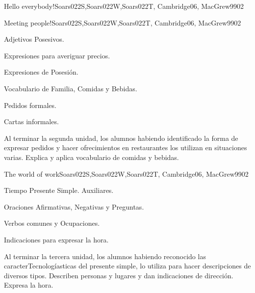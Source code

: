 \begin{syllabus}
\begin{unit}{Hello everybody!}{Soars022S,Soars022W,Soars022T, Cambridge06, MacGrew99}{0}{2}
\end{unit}

\begin{unit}{Meeting people!}{Soars022S,Soars022W,Soars022T, Cambridge06, MacGrew99}{0}{2}
   \begin{topics}
      \item Adjetivos Posesivos.
      \item Expresiones para averiguar precios.
      \item Expresiones de Posesión.
      \item Vocabulario de Familia, Comidas y Bebidas.
      \item Pedidos formales.
      \item Cartas informales.
   \end{topics}

   \begin{unitgoals}
      \item Al terminar la segunda unidad, los alumnos habiendo identificado la forma de expresar pedidos y hacer ofrecimientos en restaurantes los utilizan en situaciones varias. Explica y aplica vocabulario de comidas y bebidas.  
   \end{unitgoals}

\end{unit}

\begin{unit}{The world of work}{Soars022S,Soars022W,Soars022T, Cambridge06, MacGrew99}{0}{2}
   \begin{topics}
      \item Tiempo Presente Simple. Auxiliares.
      \item Oraciones Afirmativas, Negativas y Preguntas.
      \item Verbos comunes y Ocupaciones.
      \item Indicaciones para expresar la hora.
   \end{topics}

   \begin{unitgoals}
      \item Al terminar la tercera unidad, los alumnos habiendo reconocido las caracterTecnologíasticas del presente simple, lo utiliza para hacer descripciones de diversos tipos. Describen personas y lugares y dan indicaciones de dirección. Expresa la hora. 
   \end{unitgoals}

\end{unit}


\end{syllabus}
